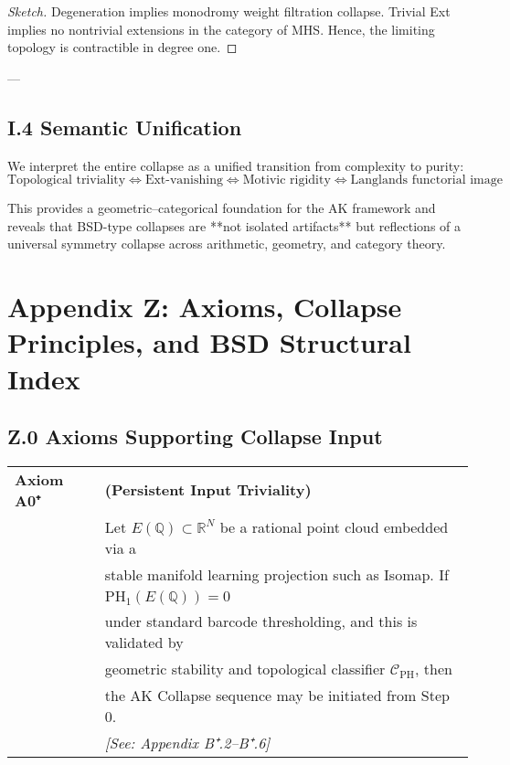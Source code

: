 \begin{proof}[Sketch]
Degeneration implies monodromy weight filtration collapse.  
Trivial Ext implies no nontrivial extensions in the category of MHS.  
Hence, the limiting topology is contractible in degree one.
\end{proof}

---

\subsection*{I.4 Semantic Unification}

We interpret the entire collapse as a unified transition from complexity to purity:
\[
\boxed{
\text{Topological triviality} \Leftrightarrow \text{Ext-vanishing} \Leftrightarrow \text{Motivic rigidity} \Leftrightarrow \text{Langlands functorial image}
}
\]

This provides a geometric–categorical foundation for the AK framework  
and reveals that BSD-type collapses are **not isolated artifacts**  
but reflections of a universal symmetry collapse across arithmetic, geometry, and category theory.




\section*{Appendix Z: Axioms, Collapse Principles, and BSD Structural Index}

\subsection*{Z.0 Axioms Supporting Collapse Input}

\begin{tabular}{ll}
\textbf{Axiom A0⁺} & \textbf{(Persistent Input Triviality)} \\
& Let \( E(\mathbb{Q}) \subset \mathbb{R}^N \) be a rational point cloud embedded via a \\
& stable manifold learning projection such as Isomap. If \\
& \quad \( \mathrm{PH}_1(E(\mathbb{Q})) = 0 \) \\
& under standard barcode thresholding, and this is validated by \\
& geometric stability and topological classifier \( \mathcal{C}_{\mathrm{PH}} \), then \\
& the AK Collapse sequence may be initiated from Step 0. \\
& \textit{[See: Appendix B⁺.2–B⁺.6]}
\end{tabular}

